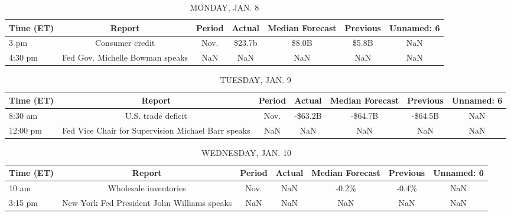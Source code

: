 \documentclass{article}%
\begin{document}
%
\normalsize%


\begin{table}[htbp]%
\caption{MONDAY, JAN. 8}%
\centering%
\begin{adjustbox}{width=1\textwidth}%
\begin{tabular}{lcccccc}
\toprule
Time (ET) &                          Report & Period & Actual & Median Forecast & Previous & Unnamed: 6 \\
\midrule
     3 pm &                 Consumer credit &   Nov. & \$23.7b &           \$8.0B &    \$5.8B &        NaN \\
  4:30 pm & Fed Gov. Michelle Bowman speaks &    NaN &    NaN &             NaN &      NaN &        NaN \\
\bottomrule
\end{tabular}
%
\end{adjustbox}%
\end{table}

%


\begin{table}[htbp]%
\caption{TUESDAY, JAN. 9}%
\centering%
\begin{adjustbox}{width=1\textwidth}%
\begin{tabular}{lcccccc}
\toprule
Time (ET) &                                             Report & Period &  Actual & Median Forecast & Previous & Unnamed: 6 \\
\midrule
  8:30 am &                                 U.S. trade deficit &   Nov. & -\$63.2B &         -\$64.7B &  -\$64.5B &        NaN \\
 12:00 pm & Fed Vice Chair for Supervision Michael Barr speaks &    NaN &     NaN &             NaN &      NaN &        NaN \\
\bottomrule
\end{tabular}
%
\end{adjustbox}%
\end{table}

%


\begin{table}[htbp]%
\caption{WEDNESDAY, JAN. 10}%
\centering%
\begin{adjustbox}{width=1\textwidth}%
\begin{tabular}{lcccccc}
\toprule
Time (ET) &                                      Report & Period & Actual & Median Forecast & Previous & Unnamed: 6 \\
\midrule
    10 am &                       Wholesale inventories &   Nov. &    NaN &           -0.2\% &    -0.4\% &        NaN \\
  3:15 pm & New York Fed President John Williams speaks &    NaN &    NaN &             NaN &      NaN &        NaN \\
\bottomrule
\end{tabular}
%
\end{adjustbox}%
\end{table}
\end{document}
